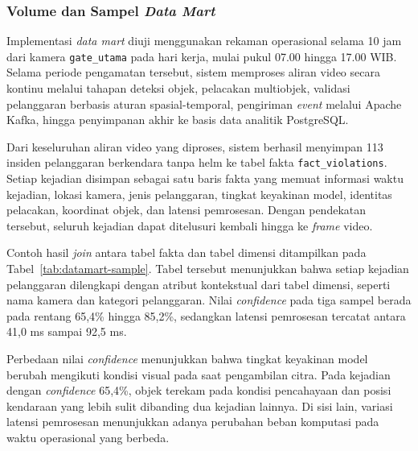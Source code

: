 \subsubsection{Volume dan Sampel \textit{Data Mart}}
\label{subsubsec:hasil-volume}

Implementasi \textit{data mart} diuji menggunakan rekaman operasional selama 10 jam dari kamera \texttt{gate\_utama} pada hari kerja, mulai pukul 07.00 hingga 17.00 WIB. Selama periode pengamatan tersebut, sistem memproses aliran video secara kontinu melalui tahapan deteksi objek, pelacakan multiobjek, validasi pelanggaran berbasis aturan spasial-temporal, pengiriman \textit{event} melalui Apache Kafka, hingga penyimpanan akhir ke basis data analitik PostgreSQL.

Dari keseluruhan aliran video yang diproses, sistem berhasil menyimpan 113 insiden pelanggaran berkendara tanpa helm ke tabel fakta \texttt{fact\_violations}. Setiap kejadian disimpan sebagai satu baris fakta yang memuat informasi waktu kejadian, lokasi kamera, jenis pelanggaran, tingkat keyakinan model, identitas pelacakan, koordinat objek, dan latensi pemrosesan. Dengan pendekatan tersebut, seluruh kejadian dapat ditelusuri kembali hingga ke \textit{frame} video.

Contoh hasil \textit{join} antara tabel fakta dan tabel dimensi ditampilkan pada Tabel~\ref{tab:datamart-sample}. Tabel tersebut menunjukkan bahwa setiap kejadian pelanggaran dilengkapi dengan atribut kontekstual dari tabel dimensi, seperti nama kamera dan kategori pelanggaran. Nilai \textit{confidence} pada tiga sampel berada pada rentang 65,4\% hingga 85,2\%, sedangkan latensi pemrosesan tercatat antara 41,0 ms sampai 92,5 ms.

Perbedaan nilai \textit{confidence} menunjukkan bahwa tingkat keyakinan model berubah mengikuti kondisi visual pada saat pengambilan citra. Pada kejadian dengan \textit{confidence} 65,4\%, objek terekam pada kondisi pencahayaan dan posisi kendaraan yang lebih sulit dibanding dua kejadian lainnya. Di sisi lain, variasi latensi pemrosesan menunjukkan adanya perubahan beban komputasi pada waktu operasional yang berbeda.


